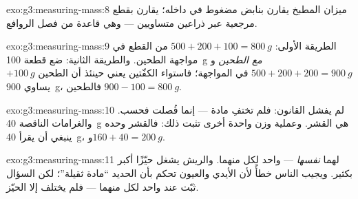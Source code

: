 \begin{solution}{exo:g3:measuring-mass:8}
ميزان المطبخ يقارن بنابض مضغوط في داخله؛  يقارن
بقطع مرجعية عبر ذراعين متساويين --- وهي قاعدة  من فصل
الروافع.
\end{solution}

\begin{solution}{exo:g3:measuring-mass:9}
الطريقة الأولى: $500 + 200 + 100 = \qty{800}{g}$ من القطع في
مواجهة الطحين. والطريقة الثانية: ضع قطعة \qty{100}{g}
\emph{مع الطحين} و$500 + 200 + 200 = \qty{900}{g}$ في المواجهة؛
فاستواء الكفّتين يعني حينئذ أن الطحين $+ \qty{100}{g}$ يساوي
\qty{900}{g}، فالطحين $900 - 100 = \qty{800}{g}$.
\end{solution}

\begin{solution}{exo:g3:measuring-mass:10}
لم يفشل القانون: فلم تختفِ مادة --- إنما فُصلت فحسب. والغرامات
الناقصة \qty{40}{g} هي القشر. وعملية وزن واحدة أخرى تثبت ذلك:
فالقشر وحده ينبغي أن يقرأ \qty{40}{g}، و$160 + 40 =
\qty{200}{g}$.
\end{solution}

\begin{solution}{exo:g3:measuring-mass:11}
لهما  \emph{نفسها} ---  واحد لكل منهما. والريش
يشغل حيّزًا أكبر بكثير. ويجيب الناس خطأً لأن الأيدي والعيون تحكم
بأن الحديد ``مادة ثقيلة''؛ لكن السؤال ثبّت  عند 
واحد لكل منهما --- فلم يختلف إلا الحيّز.
\end{solution}
